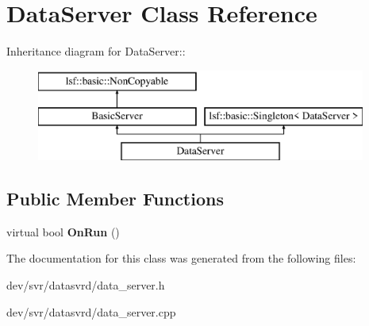 \hypertarget{classDataServer}{
\section{DataServer Class Reference}
\label{classDataServer}
}
Inheritance diagram for DataServer::\begin{figure}[H]
\begin{center}
\leavevmode
\includegraphics[height=3cm]{classDataServer}
\end{center}
\end{figure}
\subsection*{Public Member Functions}
\begin{DoxyCompactItemize}
\item 
\hypertarget{classDataServer_a2b4ec654df3921b8cb083e9fb5c498a6}{
virtual bool {\bfseries OnRun} ()}
\label{classDataServer_a2b4ec654df3921b8cb083e9fb5c498a6}

\end{DoxyCompactItemize}


The documentation for this class was generated from the following files:\begin{DoxyCompactItemize}
\item 
dev/svr/datasvrd/data\_\-server.h\item 
dev/svr/datasvrd/data\_\-server.cpp\end{DoxyCompactItemize}
